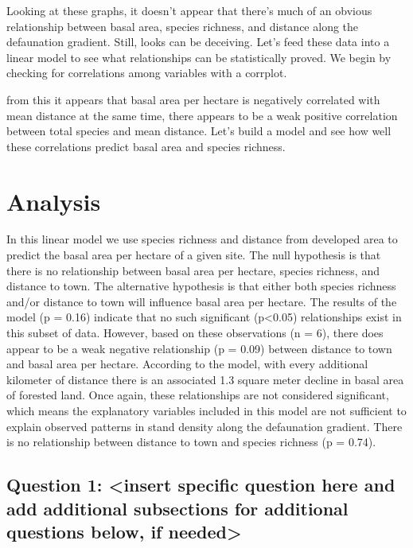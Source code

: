 \documentclass[
  12pt,
]{article}
\begin{document}
Looking at these graphs, it doesn't appear that there's much of an
obvious relationship between basal area, species richness, and distance
along the defaunation gradient. Still, looks can be deceiving. Let's
feed these data into a linear model to see what relationships can be
statistically proved. We begin by checking for correlations among
variables with a corrplot.

from this it appears that basal area per hectare is negatively
correlated with mean distance at the same time, there appears to be a
weak positive correlation between total species and mean distance. Let's
build a model and see how well these correlations predict basal area and
species richness.

\hypertarget{analysis}{%
\section{Analysis}\label{analysis}}

In this linear model we use species richness and distance from developed
area to predict the basal area per hectare of a given site. The null
hypothesis is that there is no relationship between basal area per
hectare, species richness, and distance to town. The alternative
hypothesis is that either both species richness and/or distance to town
will influence basal area per hectare. The results of the model (p =
0.16) indicate that no such significant (p\textless0.05) relationships
exist in this subset of data. However, based on these observations (n =
6), there does appear to be a weak negative relationship (p = 0.09)
between distance to town and basal area per hectare. According to the
model, with every additional kilometer of distance there is an
associated 1.3 square meter decline in basal area of forested land. Once
again, these relationships are not considered significant, which means
the explanatory variables included in this model are not sufficient to
explain observed patterns in stand density along the defaunation
gradient. There is no relationship between distance to town and species
richness (p = 0.74).

\hypertarget{question-1-insert-specific-question-here-and-add-additional-subsections-for-additional-questions-below-if-needed}{%
\subsection{Question 1: \textless insert specific question here and add
additional subsections for additional questions below, if
needed\textgreater{}}\label{question-1-insert-specific-question-here-and-add-additional-subsections-for-additional-questions-below-if-needed}}
\end{document}
